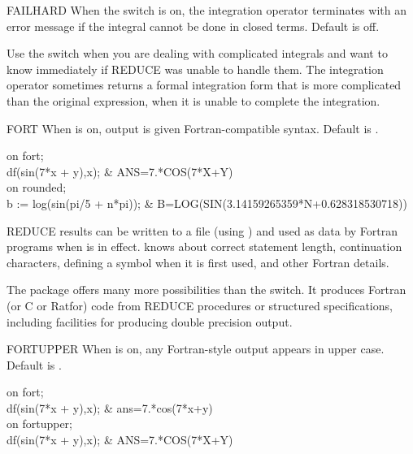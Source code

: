 \begin{Switch}{FAILHARD}
When the  switch is on, the integration operator  
terminates with an error message if the integral cannot be done in closed 
terms.
Default is off.

\begin{Comments}
Use the  switch when you are dealing with complicated integrals
and want to know immediately if REDUCE was unable to handle them.  The
integration operator sometimes returns a formal integration form that is
more complicated than the original expression, when it is unable to
complete the integration.
\end{Comments}
\end{Switch}


\begin{Switch}{FORT}
When  is on, output is given Fortran-compatible syntax.  Default
is .

\begin{Examples}
on fort; \\
df(sin(7*x + y),x);          &     ANS=7.*COS(7*X+Y) \\
on rounded; \\
b := log(sin(pi/5 + n*pi));  &
	       B=LOG(SIN(3.14159265359*N+0.628318530718))
\end{Examples}

\begin{Comments}
REDUCE results can be written to a file (using ) and used as data
by Fortran programs when  is in effect.   knows about
correct statement length, continuation characters, defining a symbol when 
it is first used, and other Fortran details.

The  package offers many more possibilities than the
 switch.  It produces Fortran (or C or Ratfor) code from REDUCE
procedures or structured specifications, including facilities for producing
double precision output.
\end{Comments}
\end{Switch}

\begin{Switch}{FORTUPPER}
When  is on, any Fortran-style output appears in upper case.
Default is .

\begin{Examples}
on fort; \\
df(sin(7*x + y),x);          &     ans=7.*cos(7*x+y) \\
on fortupper; \\
df(sin(7*x + y),x);          &     ANS=7.*COS(7*X+Y) \\
\end{Examples}
\end{Switch}


